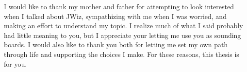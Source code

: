 {I would like to thank my mother and father for attempting to look
interested when I talked about JWiz, sympathizing with me when I was
worried, and making an effort to understand my topic.  I realize much of
what I said probably had little meaning to you, but I appreciate your
letting me use you as sounding boards.  I would also like to thank you both
for letting me set my own path through life and supporting the choices I
make. For these reasons, this thesis is for you.  

}











